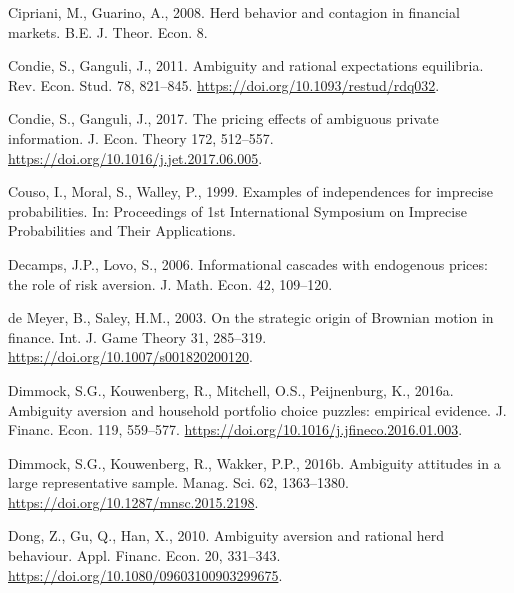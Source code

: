\documentclass[12pt,a4paper]{article}
\newenvironment{biblock}{%
  \par\vspace{2pt}\noindent\small%
  \ignorespaces
}{%
  \par\vspace{2pt}%
}
\begin{document}
\begin{biblock}
Cipriani, M., Guarino, A., 2008. Herd behavior and contagion in financial markets. B.E. J. Theor. Econ. 8.
\end{biblock}

\begin{biblock}
Condie, S., Ganguli, J., 2011. Ambiguity and rational expectations equilibria. Rev. Econ. Stud. 78, 821--845. \url{https://doi.org/10.1093/restud/rdq032}.
\end{biblock}

\begin{biblock}
Condie, S., Ganguli, J., 2017. The pricing effects of ambiguous private information. J. Econ. Theory 172, 512--557. \url{https://doi.org/10.1016/j.jet.2017.06.005}.
\end{biblock}

\begin{biblock}
Couso, I., Moral, S., Walley, P., 1999. Examples of independences for imprecise probabilities. In: Proceedings of 1st International Symposium on Imprecise Probabilities and Their Applications.
\end{biblock}

\begin{biblock}
Decamps, J.P., Lovo, S., 2006. Informational cascades with endogenous prices: the role of risk aversion. J. Math. Econ. 42, 109--120.
\end{biblock}

\begin{biblock}
de Meyer, B., Saley, H.M., 2003. On the strategic origin of Brownian motion in finance. Int. J. Game Theory 31, 285--319. \url{https://doi.org/10.1007/s001820200120}.
\end{biblock}

\begin{biblock}
Dimmock, S.G., Kouwenberg, R., Mitchell, O.S., Peijnenburg, K., 2016a. Ambiguity aversion and household portfolio choice puzzles: empirical evidence. J. Financ. Econ. 119, 559--577. \url{https://doi.org/10.1016/j.jfineco.2016.01.003}.
\end{biblock}

\begin{biblock}
Dimmock, S.G., Kouwenberg, R., Wakker, P.P., 2016b. Ambiguity attitudes in a large representative sample. Manag. Sci. 62, 1363--1380. \url{https://doi.org/10.1287/mnsc.2015.2198}.
\end{biblock}

\begin{biblock}
Dong, Z., Gu, Q., Han, X., 2010. Ambiguity aversion and rational herd behaviour. Appl. Financ. Econ. 20, 331--343. \url{https://doi.org/10.1080/09603100903299675}.
\end{biblock}
\end{document}
